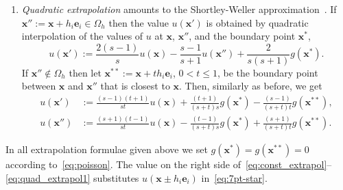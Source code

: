 \documentclass[a4paper,10pt,3p,preprint,pdftex]{elsarticle}
\begin{document}
\begin{enumerate}

\item \emph{Quadratic extrapolation} amounts to the Shortley-Weller
  approximation~\cite{fowa:60,shwe:39,mcgv:04}.  If $\mathbf{x}'' :=
  \mathbf{x} + h_i\mathbf{e}_i \in \Omega_h$ then the value
  $u(\mathbf{x}')$ is obtained by quadratic interpolation of the values
  of $u$ at $\mathbf{x}$, $\mathbf{x}''$, and the boundary point
  $\mathbf{x}^*$,
  \begin{equation} \label{eq:quad_extrapol}
    u(\mathbf{x}') := \frac{2(s\!-\!1)}{s} u(\mathbf{x}) -
    \frac{s\!-\!1}{s\!+\!1} u(\mathbf{x''}) + %
    \frac{2}{s(s\!+\!1)} g(\mathbf{x}^*).
  \end{equation}
  If $\mathbf{x}'' \not\in \Omega_h$ then let $\mathbf{x}^{**} :=
  \mathbf{x} + t h_i\mathbf{e}_i$, $0<t\le1$, be the boundary point
  between $\mathbf{x}$ and $\mathbf{x}''$ that is closest to
  $\mathbf{x}$.  Then, similarly as before, we get
  \begin{equation} \label{eq:quad_extrapol1}
    \begin{aligned}
      u(\mathbf{x}') &:= \frac{(s\!-\!1)(t\!+\!1)}{st} u(\mathbf{x}) +
      \frac{(t\!+\!1)}{(s\!+\!t)s} g(\mathbf{x}^*) -
      \frac{(s\!-\!1)}{(s\!+\!t)t} g(\mathbf{x}^{**}), \\[1mm]
      u(\mathbf{x}'') &:= \frac{(s\!+\!1)(t\!-\!1)}{st} u(\mathbf{x}) -
      \frac{(t\!-\!1)}{(s\!+\!t)s} g(\mathbf{x}^*) +
      \frac{(s\!+\!1)}{(s\!+\!t)t} g(\mathbf{x}^{**}).
    \end{aligned}
  \end{equation}
 
\end{enumerate}
In all extrapolation formulae given above we set $g(\mathbf{x}^*) =
g(\mathbf{x}^{**}) = 0$ according to~\eqref{eq:poisson}.  The value on
the right side of~\eqref{eq:const_extrapol}--\eqref{eq:quad_extrapol1}
substitutes $u(\mathbf{x}\! \pm \! h_i\mathbf{e}_i)$
in~\eqref{eq:7pt-star}.
\end{document}
